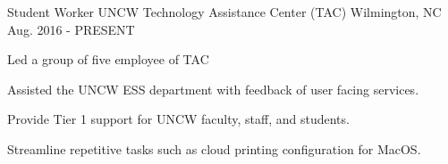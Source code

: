 

\begin{cventries}

  \cventry
    {Student Worker}
    {UNCW Technology Assistance Center (TAC)} %
    {Wilmington, NC} %
    {Aug. 2016 - PRESENT} %
    {
      \begin{cvsubentries}
        {
          \begin{cvsubitems}
            \item {Led a group of five employee of TAC}
            \item {Assisted the UNCW ESS department with feedback of user facing services.}
          \end{cvsubitems}
        }
        {
          \begin{cvsubitems}
            \item {Provide Tier 1 support for UNCW faculty, staff, and students.}
            \item {Streamline repetitive tasks such as cloud printing configuration for MacOS.}
          \end{cvsubitems}
        }
      \end{cvsubentries}
    }


\end{cventries}
